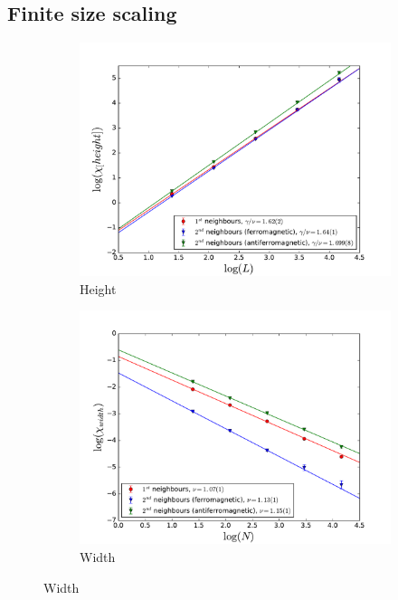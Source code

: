 \documentclass[twoside]{article}
\begin{document}
\begin{multicols}{2}
\subsection{Finite size scaling}
\begin{figure}[!tpb]
  \begin{subfigure}[b]{0.32\textwidth}
    \includegraphics[width=\textwidth]{images/plot_height.pdf}
    \caption{Height}
    \label{scaling_height}
  \end{subfigure}
  \begin{subfigure}[b]{0.32\textwidth}
    \includegraphics[width=\textwidth]{images/plot_width.pdf}
    \caption{Width}
    \label{scaling_width}
  \end{subfigure}

\end{figure}
\end{multicols}
\end{document}
